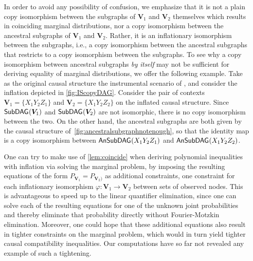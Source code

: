 \documentclass[aps,english,10pt,superscriptaddress,onecolumn,twoside,longbibliography,pra,floatfix,fleqn,nofootinbib]{revtex4-1}
\theoremstyle{definition}
\newcounter{example}[section]
\newcommand{\SmallNamedFunction}[3][]{\operatorname{\mathsf{#2}}_{#1}\parenths{#3}}
\newcommand{\subgraph}[2][]{\SmallNamedFunction[#1]{SubDAG}{#2}}
\newcommand{\ansubgraph}[2][]{\SmallNamedFunction[#1]{AnSubDAG}{#2}}
\DeclarePairedDelimiter{\parenths}{\lparen}{\rparen}
\begin{document}
In order to avoid any possibility of confusion, we emphasize that it is not a plain copy isomorphism between the subgraphs of $\bm{V}_1$ and $\bm{V}_2$ themselves which results in coinciding marginal distributions, nor a copy isomorphism between the ancestral subgraphs of $\bm{V}_1$ and $\bm{V}_2$. Rather, it is an inflationary isomorphism between the subgraphs, i.e., a copy isomorphism between the ancestral subgraphs that restricts to a copy isomorphism between the subgraphs. To see why a copy isomorphism between ancestral subgraphs {\em by itself} may not be sufficient for deriving equality of marginal distributions, we offer the following example. Take as the original causal structure the instrumental scenario of \citet{pearl1995instrumental}, and consider the inflation depicted in \cref{fig:IScopyDAG}.  Consider the pair of contexts $\bm{V}_1 = \{ X_1 Y_2 Z_1\}$ and $\bm{V}_2 = \{ X_1 Y_2 Z_2\}$ on the inflated causal structure. Since $\subgraph{\bm{V}_1}$ and $\subgraph{\bm{V}_2}$ are not isomorphic, there is no copy isomorphism between the two. On the other hand, 
the ancestral subgraphs are both given by the causal structure of~\cref{fig:ancestralsubgraphnotenough}, so that the identity map is a copy isomorphism between $\ansubgraph{X_1 Y_2 Z_1}$ and $\ansubgraph{X_1 Y_2 Z_2}$.

One can try to make use of \cref{lem:coincide} when deriving polynomial inequalities with inflation via solving the marginal problem, by imposing the resulting equations of the form $P_{\bm{V}_1} = P_{\bm{V}_2)}$ as additional constraints, one constraint for each inflationary isomorphism $\varphi : \bm{V}_1\to\bm{V}_2$ between sets of observed nodes. This is advantageous to speed up to the linear quantifier elimination, since one can solve each of the resulting equations for one of the unknown joint probabilities and thereby eliminate that probability directly without Fourier-Motzkin elimination. Moreover, one could hope that these additional equations also result in tighter constraints on the marginal problem, which would in turn yield tighter causal compatibility inequalities. Our computations have so far not revealed any example of such a tightening.
\end{document}
